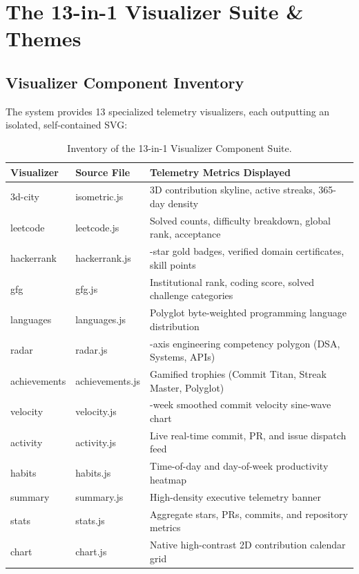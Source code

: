 \documentclass[12pt,a4paper]{report}
\begin{document}
\chapter{The 13-in-1 Visualizer Suite \& Themes}

\section{Visualizer Component Inventory}
The system provides 13 specialized telemetry visualizers, each outputting an isolated, self-contained SVG:

\begin{table}[htbp]
\centering
\small
\begin{tabularx}{\textwidth}{>{\ttfamily\raggedright\arraybackslash}p{2.8cm}>{\ttfamily\raggedright\arraybackslash}p{3.2cm}>{\raggedright\arraybackslash}X}
\toprule
\textbf{Visualizer} & \textbf{Source File} & \textbf{Telemetry Metrics Displayed} \\
\midrule
3d-city & isometric.js & 3D contribution skyline, active streaks, 365-day density \\
leetcode & leetcode.js & Solved counts, difficulty breakdown, global rank, acceptance \\
hackerrank & hackerrank.js & 5-star gold badges, verified domain certificates, skill points \\
gfg & gfg.js & Institutional rank, coding score, solved challenge categories \\
languages & languages.js & Polyglot byte-weighted programming language distribution \\
radar & radar.js & 5-axis engineering competency polygon (DSA, Systems, APIs) \\
achievements & achievements.js & Gamified trophies (Commit Titan, Streak Master, Polyglot) \\
velocity & velocity.js & 52-week smoothed commit velocity sine-wave chart \\
activity & activity.js & Live real-time commit, PR, and issue dispatch feed \\
habits & habits.js & Time-of-day and day-of-week productivity heatmap \\
summary & summary.js & High-density executive telemetry banner \\
stats & stats.js & Aggregate stars, PRs, commits, and repository metrics \\
chart & chart.js & Native high-contrast 2D contribution calendar grid \\
\bottomrule
\end{tabularx}
\caption{Inventory of the 13-in-1 Visualizer Component Suite.}
\label{tab:components}
\end{table}
\end{document}
